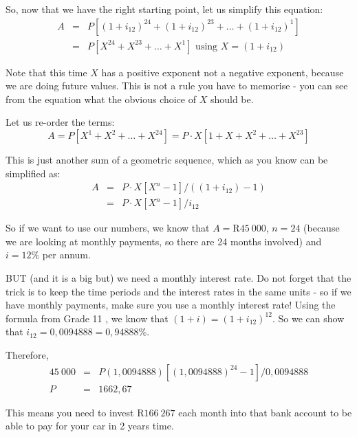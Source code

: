 So, now that we have the right starting point, let us simplify this equation:
\begin{eqnarray*}
A &=& P[(1+i_{12})^{24} + (1+i_{12})^{23} + \ldots + (1+i_{12})^{1}]\\
&=& P [ X^{24} + X^{23} + \ldots + X^1] \mbox{ using $X=(1+i_{12})$}
\end{eqnarray*}

Note that this time $X$ has a positive exponent not a negative exponent, because we are doing future values. This is not a rule you have to memorise - you can see from the equation what the obvious choice of $X$ should be.

Let us re-order the terms:
\begin{equation*}
A = P [ X^1 + X^2 + \ldots + X^{24}] = P \cdot X [1 + X + X^2 + \ldots + X^{23}]
\end{equation*}

This is just another sum of a geometric sequence, which as you know can be simplified as:
\begin{eqnarray*}
A &=& P \cdot X [X^n - 1] / ((1+i_{12})-1)\\
&=& P \cdot X [X^n - 1] / i_{12}
\end{eqnarray*}

So if we want to use our numbers, we know that $A = $R$45~000$, $n=24$ (because we are looking at monthly payments, so there are 24 months involved) and $i = 12\%$ per annum.

BUT (and it is a big but) we need a monthly interest rate. Do not forget that the trick is to keep the time periods and the interest rates in the same units - so if we have monthly payments, make sure you use a monthly interest rate! Using the formula from Grade 11%
, we know that $(1+i) = (1+i_{12})^{12}$. So we can show that $i_{12} = 0,0094888 = 0,94888 \%$. 

Therefore,
\begin{eqnarray*}
45~000 &=& P (1,0094888) [(1,0094888)^{24} - 1] / 0,0094888\\
P&=&1 662,67
\end{eqnarray*}

This means you need to invest R$166~267$ each month into that bank account to be able to pay for your car in 2 years time.


